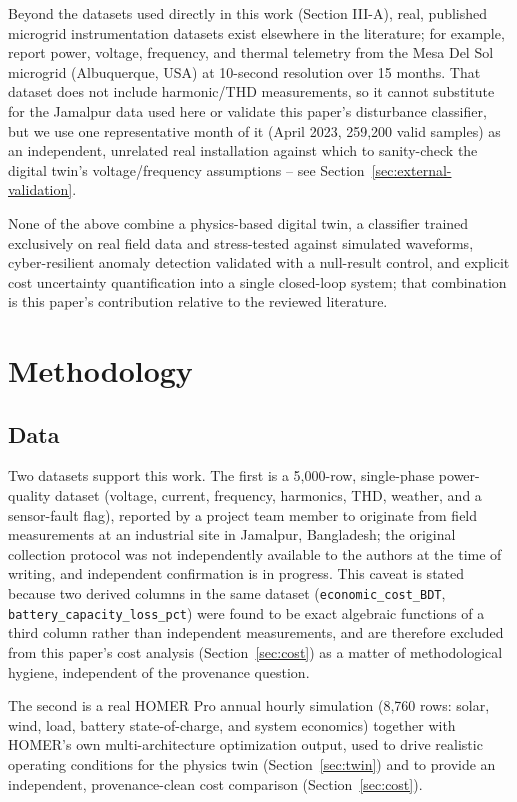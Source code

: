 \documentclass[conference]{IEEEtran}
\begin{document}
Beyond the datasets used directly in this work (Section III-A),
real, published microgrid instrumentation datasets exist elsewhere in
the literature; for example, \cite{bashir2023mesadelsol} report
power, voltage, frequency, and thermal telemetry from the Mesa Del
Sol microgrid (Albuquerque, USA) at 10-second resolution over 15
months. That dataset does not include harmonic/THD measurements, so
it cannot substitute for the Jamalpur data used here or validate
this paper's disturbance classifier, but we use one representative
month of it (April 2023, 259{,}200 valid samples) as an independent,
unrelated real installation against which to sanity-check the
digital twin's voltage/frequency assumptions -- see
Section~\ref{sec:external-validation}.

None of the above combine a physics-based digital twin, a classifier
trained exclusively on real field data and stress-tested against
simulated waveforms, cyber-resilient anomaly detection validated with
a null-result control, and explicit cost uncertainty quantification
into a single closed-loop system; that combination is this paper's
contribution relative to the reviewed literature.

\section{Methodology}

\subsection{Data}
Two datasets support this work. The first is a 5,000-row,
single-phase power-quality dataset (voltage, current, frequency,
harmonics, THD, weather, and a sensor-fault flag), reported by a
project team member to originate from field measurements at an
industrial site in Jamalpur, Bangladesh; the original collection
protocol was not independently available to the authors at the time
of writing, and independent confirmation is in progress. This
caveat is stated because two derived columns in the same dataset
(\texttt{economic\_cost\_BDT}, \texttt{battery\_capacity\_loss\_pct})
were found to be exact algebraic functions of a third column rather
than independent measurements, and are therefore excluded from this
paper's cost analysis (Section~\ref{sec:cost}) as a matter of
methodological hygiene, independent of the provenance question.

The second is a real HOMER Pro annual hourly simulation (8,760 rows:
solar, wind, load, battery state-of-charge, and system economics)
together with HOMER's own multi-architecture optimization output,
used to drive realistic operating conditions for the physics twin
(Section~\ref{sec:twin}) and to provide an independent,
provenance-clean cost comparison (Section~\ref{sec:cost}).
\end{document}
